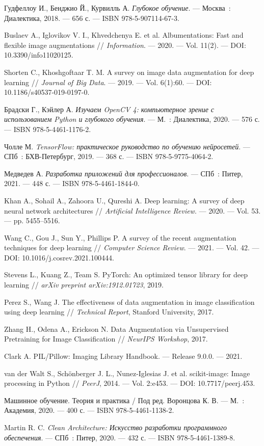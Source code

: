 \begin{thebibliography}{99}
	
	 Гудфеллоу И., Бенджио Й., Курвилль А. \emph{Глубокое обучение}. — Москва~: Диалектика, 2018. — 656 с. — ISBN 978-5-907114-67-3.
	
	 Buslaev A., Iglovikov V. I., Khvedchenya E. et al. Albumentations: Fast and flexible image augmentations // \emph{Information}. — 2020. — Vol. 11(2). — DOI: 10.3390/info11020125.
	
	 Shorten C., Khoshgoftaar T. M. A survey on image data augmentation for deep learning // \emph{Journal of Big Data}. — 2019. — Vol. 6(1):60. — DOI: 10.1186/s40537-019-0197-0.
	
	 Брадски Г., Кэйлер А. \emph{Изучаем OpenCV 4: компьютерное зрение с использованием Python и глубокого обучения}. — М.~: Диалектика, 2020. — 576 с. — ISBN 978-5-4461-1176-2.
	
	 Чолле М. \emph{TensorFlow: практическое руководство по обучению нейросетей}. — СПб~: БХВ-Петербург, 2019. — 368 с. — ISBN 978-5-9775-4064-2.
	
	 Медведев А. \emph{Разработка приложений для профессионалов}. — СПб~: Питер, 2021. — 448 с. — ISBN 978-5-4461-1844-0.
	
	 Khan A., Sohail A., Zahoora U., Qureshi A. Deep learning: A survey of deep neural network architectures // \emph{Artificial Intelligence Review}. — 2020. — Vol. 53. — pp. 5455–5516.
	
	 Wang C., Gou J., Sun Y., Phillips P. A survey of the recent augmentation techniques for deep learning // \emph{Computer Science Review}. — 2021. — Vol. 42. — DOI: 10.1016/j.cosrev.2021.100444.
	
	 Stevens L., Kuang Z., Team S. PyTorch: An optimized tensor library for deep learning // \emph{arXiv preprint arXiv:1912.01723}, 2019.
	
	 Perez S., Wang J. The effectiveness of data augmentation in image classification using deep learning // \emph{Technical Report}, Stanford University, 2017.
	
	 Zhang H., Odena A., Erickson N. Data Augmentation via Unsupervised Pretraining for Image Classification // \emph{NeurIPS Workshop}, 2017.
	
	 Clark A. PIL/Pillow: Imaging Library Handbook. — Release 9.0.0. — 2021.
	
	 van der Walt S., Schönberger J. L., Nunez-Iglesias J. et al. scikit-image: Image processing in Python // \emph{PeerJ}, 2014. — Vol. 2:e453. — DOI: 10.7717/peerj.453.
	
	 Машинное обучение. Теория и практика / Под ред. Воронцова К. В. — М.~: Академия, 2020. — 400 с. — ISBN 978-5-4461-1138-2.
	
	 Martin R. C. \emph{Clean Architecture: Искусство разработки программного обеспечения}. — СПб~: Питер, 2020. — 432 с. — ISBN 978-5-4461-1389-8.
	
\end{thebibliography}
